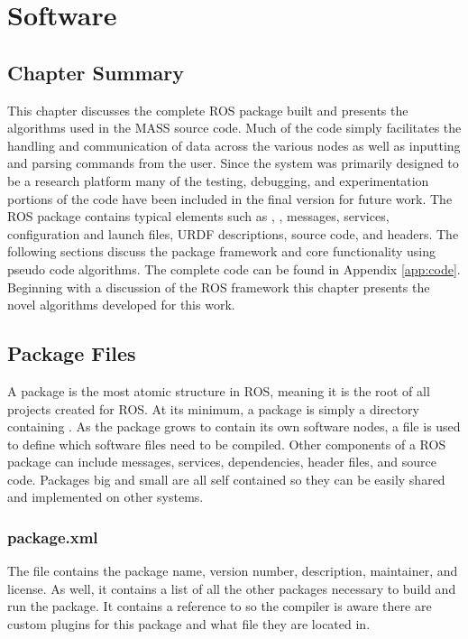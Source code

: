 \chapter{Software}
\label{chap:code}
\section{Chapter Summary}
This chapter discusses the complete ROS package built and presents the algorithms used in the MASS source code. Much of the code simply facilitates the handling and communication of data across the various nodes as well as inputting and parsing commands from the user. Since the system was primarily designed to be a research platform many of the testing, debugging, and experimentation portions of the code have been included in the final version for future work. The ROS package contains typical elements such as , , messages, services, configuration and launch files, URDF descriptions, source code, and headers. The following sections discuss the package framework and core functionality using pseudo code algorithms. The complete code can be found in Appendix \ref{app:code}. Beginning with a discussion of the ROS framework this chapter presents the novel algorithms developed for this work.\\
\section{Package Files}

A package is the most atomic structure in ROS, meaning it is the root of all projects created for ROS. At its minimum, a package is simply a directory containing . As the package grows to contain its own software nodes, a  file is used to define which software files need to be compiled. Other components of a ROS package can include messages, services, dependencies, header files, and source code. Packages big and small are all self contained so they can be easily shared and implemented on other systems.\\

\subsection{package.xml}
The file  contains the package name, version number, description, maintainer, and license. As well, it contains a list of all the other packages necessary to build and run the package. It contains a reference to  so the compiler is aware there are custom plugins for this package and what file they are located in.\\

